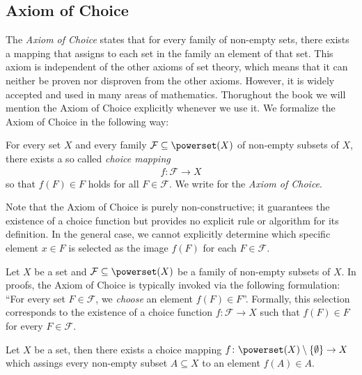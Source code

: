 \subsection{Axiom of Choice}

The \emph{Axiom of Choice} states that for every family of non-empty sets, there exists a mapping that assigns to each set in the family an element of that set. This axiom is independent of the other axioms of set theory, which means that it can neither be proven nor disproven from the other axioms. However, it is widely accepted and used in many areas of mathematics. Thorughout the book we will mention the Axiom of Choice explicitly whenever we use it. We formalize the Axiom of Choice in the following way:

\begin{axiom}\label{axiom:mappings:choice}
    For every set $X$ and every family $\mathcal F\subseteq\powerset(X)$ of non-empty subsets of $X$, there exists a so called \emph{choice mapping} \begin{align}f\colon\mathcal F\to X\end{align}
    so that $f(F)\in F$ holds for all $F\in\mathcal F$. We write  for the \emph{Axiom of Choice}.
\end{axiom}

\begin{remarks}
    \begin{remarkenumerate}
        \item Note that the Axiom of Choice is purely non-constructive; it guarantees the existence of a choice function but provides no explicit rule or algorithm for its definition. In the general case, we cannot explicitly determine which specific element $x \in F$ is selected as the image $f(F)$ for each $F \in \mathcal{F}$.
        \item Let $X$ be a set and $\mathcal{F} \subseteq \powerset(X)$ be a family of non-empty subsets of $X$. In proofs, the Axiom of Choice is typically invoked via the following formulation: \enquote{For every set $F \in \mathcal{F}$, we \emph{choose} an element $f(F) \in F$}. Formally, this selection corresponds to the existence of a choice function $f \colon \mathcal{F} \to X$ such that $f(F) \in F$ for every $F \in \mathcal{F}$.
        \item Let $X$ be a set, then there exists a choice mapping $f\colon\powerset(X)\setminus\{\emptyset\}\to X$ which assings every non-empty subset $A\subseteq X$ to an element $f(A)\in A$.
    \end{remarkenumerate}
\end{remarks}


